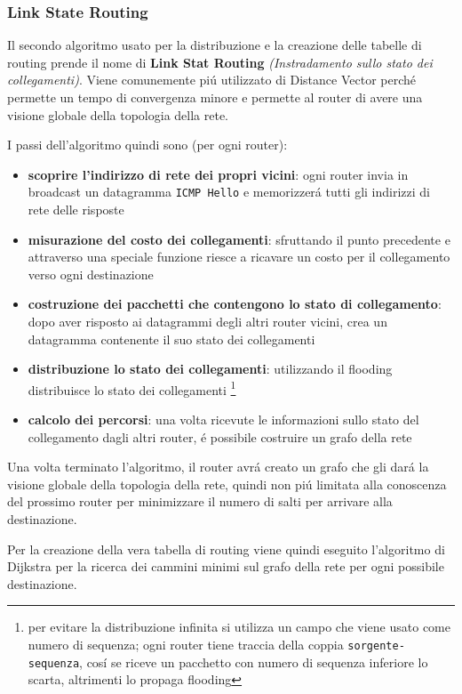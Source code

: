 \documentclass[12pt]{article}
\def\code#1{\texttt{#1}}
\begin{document}
\clearpage
\subsubsection{Link State Routing}\label{router-distribuzione-tabelle-routing-link-state-routing}
Il secondo algoritmo usato per la distribuzione e la creazione delle tabelle di routing prende il nome di \textbf{Link Stat 
Routing} \textit{(Instradamento sullo stato dei collegamenti)}. Viene comunemente pi\'u utilizzato di Distance Vector 
perch\'e permette un tempo di convergenza minore e permette al router di avere una visione globale della topologia della 
rete.

I passi dell'algoritmo quindi sono (per ogni router):
\begin{itemize}[noitemsep]
	\item \textbf{scoprire l'indirizzo di rete dei propri vicini}: ogni router invia in broadcast un datagramma 
	      \code{ICMP Hello} e memorizzer\'a tutti gli indirizzi di rete delle risposte
	\item \textbf{misurazione del costo dei collegamenti}: sfruttando il punto precedente e attraverso una speciale 	
	      funzione riesce a ricavare un costo per il collegamento verso ogni destinazione
	\item \textbf{costruzione dei pacchetti che contengono lo stato di collegamento}: dopo aver risposto ai datagrammi 	
	      degli altri router vicini, crea un datagramma contenente il suo stato dei collegamenti
	\item \textbf{distribuzione lo stato dei collegamenti}: utilizzando il flooding distribuisce lo stato dei collegamenti 
          \footnote{per evitare la distribuzione infinita si utilizza un campo che viene usato come numero di sequenza; 
          ogni router tiene traccia della coppia \code{sorgente-sequenza}, cos\'i se riceve un pacchetto con numero di 
          sequenza inferiore lo scarta, altrimenti lo propaga flooding}
	\item \textbf{calcolo dei percorsi}: una volta ricevute le informazioni sullo stato del collegamento dagli altri
		  router, \'e possibile costruire un grafo della rete
\end{itemize}
Una volta terminato l'algoritmo, il router avr\'a creato un grafo che gli dar\'a la visione globale della topologia della 
rete, quindi non pi\'u limitata alla conoscenza del prossimo router per minimizzare il numero di salti per arrivare alla 
destinazione. 

Per la creazione della vera tabella di routing viene quindi eseguito l'algoritmo di Dijkstra per la ricerca dei cammini 
minimi sul grafo della rete per ogni possibile destinazione.
\end{document}
